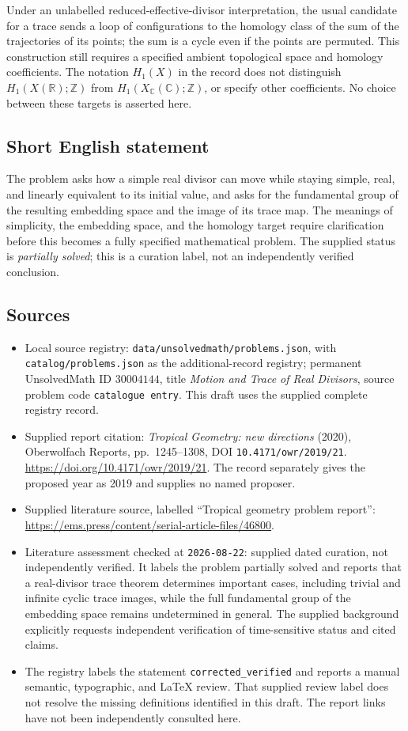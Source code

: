 \documentclass[11pt]{article}
\newcommand{\Z}{\mathbb{Z}}
\newcommand{\R}{\mathbb{R}}
\newcommand{\C}{\mathbb{C}}
\begin{document}
Under an unlabelled reduced-effective-divisor interpretation, the usual candidate for a trace sends a loop of configurations to the homology class of the sum of the trajectories of its points; the sum is a cycle even if the points are permuted. This construction still requires a specified ambient topological space and homology coefficients. The notation \(H_1(X)\) in the record does not distinguish \(H_1(X(\R);\Z)\) from \(H_1(X_{\C}(\C);\Z)\), or specify other coefficients. No choice between these targets is asserted here.
\subsection{Short English statement}
The problem asks how a simple real divisor can move while staying simple, real, and linearly equivalent to its initial value, and asks for the fundamental group of the resulting embedding space and the image of its trace map. The meanings of simplicity, the embedding space, and the homology target require clarification before this becomes a fully specified mathematical problem. The supplied status is \emph{partially solved}; this is a curation label, not an independently verified conclusion.
\subsection{Sources}
\begin{itemize}
\item Local source registry: \texttt{data/unsolvedmath/problems.json}, with \texttt{catalog/problems.json} as the additional-record registry; permanent UnsolvedMath ID \(30004144\), title \emph{Motion and Trace of Real Divisors}, source problem code \texttt{catalogue entry}. This draft uses the supplied complete registry record.
\item Supplied report citation: \emph{Tropical Geometry: new directions} (2020), Oberwolfach Reports, pp.\ 1245--1308, DOI \texttt{10.4171/owr/2019/21}. \url{https://doi.org/10.4171/owr/2019/21}. The record separately gives the proposed year as 2019 and supplies no named proposer.
\item Supplied literature source, labelled ``Tropical geometry problem report'': \url{https://ems.press/content/serial-article-files/46800}.
\item Literature assessment checked at \texttt{2026-08-22}: supplied dated curation, not independently verified. It labels the problem partially solved and reports that a real-divisor trace theorem determines important cases, including trivial and infinite cyclic trace images, while the full fundamental group of the embedding space remains undetermined in general. The supplied background explicitly requests independent verification of time-sensitive status and cited claims.
\item The registry labels the statement \texttt{corrected\_verified} and reports a manual semantic, typographic, and LaTeX review. That supplied review label does not resolve the missing definitions identified in this draft. The report links have not been independently consulted here.
\end{itemize}
\end{document}
